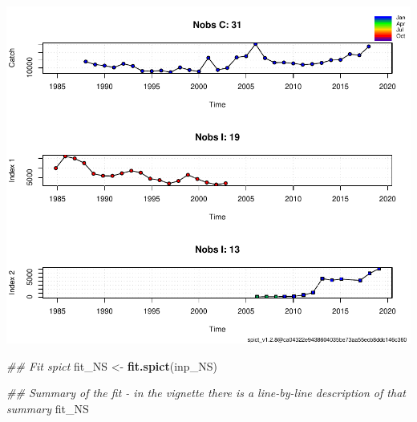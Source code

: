 \documentclass[
]{article}
\newenvironment{Shaded}{\begin{snugshade}}{\end{snugshade}}
\newcommand{\CommentTok}[1]{\textcolor[rgb]{0.56,0.35,0.01}{\textit{#1}}}
\newcommand{\KeywordTok}[1]{\textcolor[rgb]{0.13,0.29,0.53}{\textbf{#1}}}
\newcommand{\NormalTok}[1]{#1}
\newcommand{\StringTok}[1]{\textcolor[rgb]{0.31,0.60,0.02}{#1}}
\begin{document}
\includegraphics{aru.27.123a4_SPiCT_WD_files/figure-latex/fit_scenario1-1.pdf}

\begin{Shaded}
\begin{Highlighting}[]
\CommentTok{## Fit spict}
\NormalTok{fit_NS <-}\StringTok{ }\KeywordTok{fit.spict}\NormalTok{(inp_NS)}

\CommentTok{## Summary of the fit - in the vignette there is a line-by-line description of that summary}
\NormalTok{fit_NS}
\end{Highlighting}
\end{Shaded}
\end{document}
